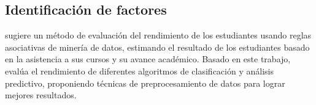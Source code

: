 





\subsection{Identificación de factores}
\textcite{borkar2013predicting} sugiere un método de evaluación del rendimiento de los estudiantes usando reglas asociativas de minería de datos, estimando el resultado de los estudiantes basado en la asistencia a sus cursos y su avance académico. Basado en este trabajo, \textcite{shazmeen2013performance} evalúa el rendimiento de diferentes algoritmos de clasificación y análisis predictivo, proponiendo técnicas de preprocesamiento de datos para lograr mejores resultados.

